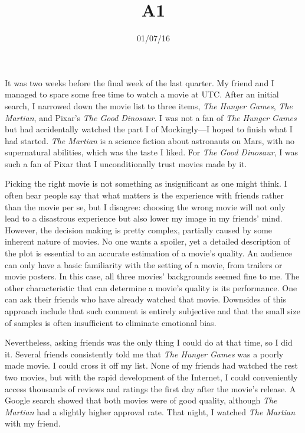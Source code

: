 \documentclass{writing}
\title{A1}
\date{01/07/16}
\begin{document}
\maketitle

It was two weeks before the final week of the last quarter. My friend
and I managed to spare some free time to watch a movie at UTC. After an
initial search, I narrowed down the movie list to three items, \emph{The
Hunger Games}, \emph{The Martian}, and Pixar's \emph{The Good Dinosaur}.
I was not a fan of \emph{The Hunger Games} but had accidentally watched
the part I of Mockingly---I hoped to finish what I had started.
\emph{The Martian} is a science fiction about astronauts on Mars, with
no supernatural abilities, which was the taste I liked. For \emph{The
Good Dinosaur}, I was such a fan of Pixar that I unconditionally trust
movies made by it.

Picking the right movie is not something as insignificant as one might
think. I often hear people say that what matters is the experience with
friends rather than the movie per se, but I disagree: choosing the wrong
movie will not only lead to a disastrous experience but also lower my
image in my friends' mind. However, the decision making is pretty
complex, partially caused by some inherent nature of movies. No one
wants a spoiler, yet a detailed description of the plot is essential to
an accurate estimation of a movie's quality. An audience can only have a
basic familiarity with the setting of a movie, from trailers or movie
posters. In this case, all three movies' backgrounds seemed fine to me.
The other characteristic that can determine a movie's quality is its
performance. One can ask their friends who have already watched that
movie. Downsides of this approach include that such comment is entirely
subjective and that the small size of samples is often insufficient to
eliminate emotional bias.

Nevertheless, asking friends was the only thing I could do at that time,
so I did it. Several friends consistently told me that \emph{The Hunger
Games} was a poorly made movie. I could cross it off my list. None of my
friends had watched the rest two movies, but with the rapid development
of the Internet, I could conveniently access thousands of reviews and
ratings the first day after the movie's release. A Google search showed
that both movies were of good quality, although \emph{The Martian} had a
slightly higher approval rate. That night, I watched \emph{The Martian}
with my friend.
\end{document}
